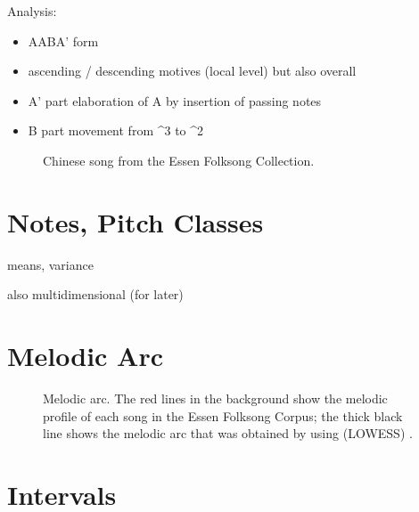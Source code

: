 \documentclass[letterpaper,10pt,english]{sphinxmanual}
\begin{document}
Analysis:
\begin{itemize}
\item {} 
AABA’ form

\item {} 
ascending / descending motives (local level) but also overall

\item {} 
A’ part elaboration of A by insertion of passing notes

\item {} 
B part movement from \textasciicircum{}3 to \textasciicircum{}2

\end{itemize}

\begin{figure}[htbp]
\centering
\capstart

\noindent{}
\caption{Chinese song  from the Essen Folksong Collection.}\label{\detokenize{3_folk_songs:id4}}\end{figure}


\section{Notes, Pitch Classes}
\label{\detokenize{3_folk_songs:notes-pitch-classes}}

means, variance

also multidimensional (for later)


\section{Melodic Arc}
\label{\detokenize{3_folk_songs:melodic-arc}}

\begin{figure}[htbp]
\centering
\capstart

\noindent{}
\caption{Melodic arc. The red lines in the background show the melodic profile of each song in the Essen Folksong Corpus;
the thick black line shows the melodic arc that was obtained by using  (LOWESS) .}\label{\detokenize{3_folk_songs:id5}}\end{figure}


\section{Intervals}
\label{\detokenize{3_folk_songs:intervals}}
\end{document}
